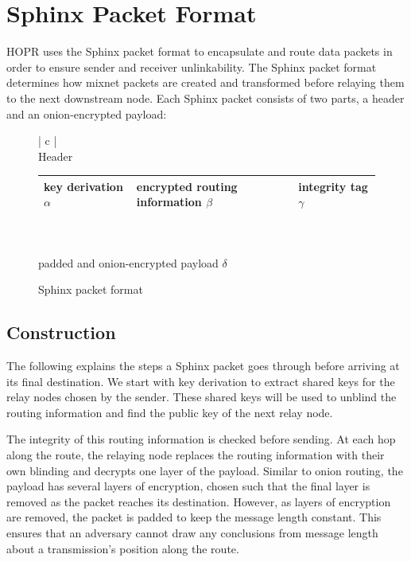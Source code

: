 \section{Sphinx Packet Format}
\label{sec:sphinx}

HOPR uses the Sphinx packet format \cite{sphinxpaper} to encapsulate and route data packets in order to ensure sender and receiver unlinkability. The Sphinx packet format determines how mixnet packets are created and transformed before relaying them to the next downstream node. Each Sphinx packet consists of two parts, a header and an onion-encrypted payload:

\begin{figure}[H]
    \centering
    \begin{tabular}{| c |}
        \hline
        \\[-0.8em]
        Header                                       \\[0.2em]
        \begin{tabular}{| m{} | m{} | m{} |}
            \hline
            key derivation $\alpha$ & encrypted routing information $\beta$ & integrity tag $\gamma$ \\
            \hline
        \end{tabular}                    \\[0.9em]
        \hline
        \hline
        \\[-0.7em]
        padded and onion-encrypted payload  $\delta$ \\[0.7em]
        \hline
    \end{tabular}
    \label{fig:Sphinx packet format}
    \caption{Sphinx packet format}
\end{figure}

\subsection{Construction}

The following explains the steps a Sphinx packet goes through before arriving at its final destination. We start with key derivation to extract shared keys for the relay nodes chosen by the sender. These shared keys will be used to unblind the routing information and find the public key of the next relay node. 

The integrity of this routing information is checked before sending. At each hop along the route, the relaying node replaces the routing information with their own blinding and decrypts one layer of the payload. Similar to onion routing, the payload has several layers of encryption, chosen such that the final layer is removed as the packet reaches its destination. However, as layers of encryption are removed, the packet is padded to keep the message length constant. This ensures that an adversary cannot draw any conclusions from message length about a transmission's position along the route.

